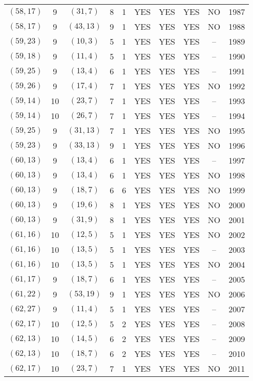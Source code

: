 \begin{longtable}{|c|c|c|c|c|c|c|c|c|c|}
$(58, 17)$ & 9 & $(31, 7)$ & 8 & 1 & YES & YES & YES & NO & 1987\\
$(58, 17)$ & 9 & $(43, 13)$ & 9 & 1 & YES & YES & YES & NO & 1988\\
$(59, 23)$ & 9 & $(10, 3)$ & 5 & 1 & YES & YES & YES & -- & 1989\\
$(59, 18)$ & 9 & $(11, 4)$ & 5 & 1 & YES & YES & YES & -- & 1990\\
$(59, 25)$ & 9 & $(13, 4)$ & 6 & 1 & YES & YES & YES & -- & 1991\\
$(59, 26)$ & 9 & $(17, 4)$ & 7 & 1 & YES & YES & YES & NO & 1992\\
$(59, 14)$ & 10 & $(23, 7)$ & 7 & 1 & YES & YES & YES & -- & 1993\\
$(59, 14)$ & 10 & $(26, 7)$ & 7 & 1 & YES & YES & YES & -- & 1994\\
$(59, 25)$ & 9 & $(31, 13)$ & 7 & 1 & YES & YES & YES & NO & 1995\\
$(59, 23)$ & 9 & $(33, 13)$ & 9 & 1 & YES & YES & YES & NO & 1996\\
$(60, 13)$ & 9 & $(13, 4)$ & 6 & 1 & YES & YES & YES & -- & 1997\\
$(60, 13)$ & 9 & $(13, 4)$ & 6 & 1 & YES & YES & YES & NO & 1998\\
$(60, 13)$ & 9 & $(18, 7)$ & 6 & 6 & YES & YES & YES & NO & 1999\\
$(60, 13)$ & 9 & $(19, 6)$ & 8 & 1 & YES & YES & YES & NO & 2000\\
$(60, 13)$ & 9 & $(31, 9)$ & 8 & 1 & YES & YES & YES & NO & 2001\\
$(61, 16)$ & 10 & $(12, 5)$ & 5 & 1 & YES & YES & YES & NO & 2002\\
$(61, 16)$ & 10 & $(13, 5)$ & 5 & 1 & YES & YES & YES & -- & 2003\\
$(61, 16)$ & 10 & $(13, 5)$ & 5 & 1 & YES & YES & YES & NO & 2004\\
$(61, 17)$ & 9 & $(18, 7)$ & 6 & 1 & YES & YES & YES & -- & 2005\\
$(61, 22)$ & 9 & $(53, 19)$ & 9 & 1 & YES & YES & YES & NO & 2006\\
$(62, 27)$ & 9 & $(11, 4)$ & 5 & 1 & YES & YES & YES & -- & 2007\\
$(62, 17)$ & 10 & $(12, 5)$ & 5 & 2 & YES & YES & YES & -- & 2008\\
$(62, 13)$ & 10 & $(14, 5)$ & 6 & 2 & YES & YES & YES & -- & 2009\\
$(62, 13)$ & 10 & $(18, 7)$ & 6 & 2 & YES & YES & YES & -- & 2010\\
$(62, 17)$ & 10 & $(23, 7)$ & 7 & 1 & YES & YES & YES & NO & 2011\\

\end{longtable}
